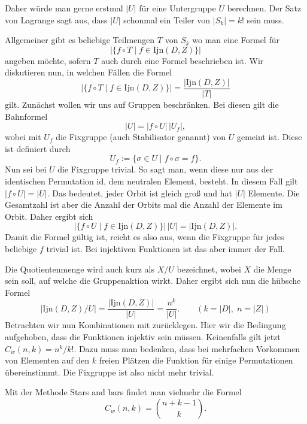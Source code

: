 \documentclass[a4paper,12pt,fleqn]{article}
\begin{document}
Daher würde man gerne erstmal $|U|$ für eine Untergruppe
$U$ berechnen. Der Satz von Lagrange sagt aus, dass $|U|$ schonmal
ein Teiler von $|S_k|=k!$ sein muss.

Allgemeiner gibt es beliebige Teilmengen $T$ von $S_k$ wo man
eine Formel für
\[|\{f\circ T\;|\;f\in\mathrm{Ijn}(D,Z)\}|\]
angeben möchte, sofern $T$ auch durch eine Formel
beschrieben ist. Wir diskutieren nun, in welchen Fällen die
Formel
\[|\{f\circ T\;|\;f\in\mathrm{Ijn}(D,Z)\}|
= \frac{|\mathrm{Ijn}(D,Z)|}{|T|}\]
gilt. Zunächst wollen wir uns auf Gruppen beschränken.
Bei diesen gilt die Bahnformel
\[|U| = |f\circ U|\,|U_f|,\]
wobei mit $U_f$ die Fixgruppe (auch Stabilisator genannt) von $U$
gemeint ist. Diese ist definiert durch
\[U_f := \{\sigma\in U\;|\; f\circ\sigma = f\}.\]
Nun sei bei $U$ die Fixgruppe trivial. So sagt man,
wenn diese nur aus der identischen Permutation $\mathrm{id}$,
dem neutralen Element, besteht. In diesem Fall gilt $|f\circ U|=|U|$.
Das bedeutet, jeder Orbit ist gleich groß und hat $|U|$ Elemente.
Die Gesamtzahl ist aber die Anzahl der Orbits mal die Anzahl der
Elemente im Orbit. Daher ergibt sich
\[|\{f\circ U\;|\;f\in\mathrm{Ijn}(D,Z)\}|\,|U|
= |\mathrm{Ijn}(D,Z)|.\]
Damit die Formel gültig ist, reicht es also aus, wenn die
Fixgruppe für jedes beliebige $f$ trivial ist. Bei injektiven
Funktionen ist das aber immer der Fall.

Die Quotientenmenge wird auch kurz als $X/U$ bezeichnet,
wobei $X$ die Menge sein soll, auf welche die Gruppenaktion wirkt.
Daher ergibt sich nun die hübsche Formel
\[|\mathrm{Ijn}(D,Z)/U| = \frac{|\mathrm{Ijn}(D,Z)|}{|U|}
= \frac{n^{\underline k}}{|U|}.\qquad(k=|D|,\;n=|Z|)\]
%
Betrachten wir nun Kombinationen mit zurücklegen.
Hier wir die Bedingung aufgehoben, dass die Funktionen injektiv
sein müssen. Keinenfalls gilt jetzt $C_w(n,k)=n^k/k!$. Dazu
muss man bedenken, dass bei mehrfachen Vorkommen von Elementen
auf den $k$ freien Plätzen die Funktion für einige Permutationen
übereinstimmt. Die Fixgruppe ist also nicht mehr trivial.

Mit der Methode {\glqq}Stars and bars{\grqq} findet man vielmehr
die Formel
\[C_w(n,k) = \binom{n+k-1}{k}.\]
\end{document}
